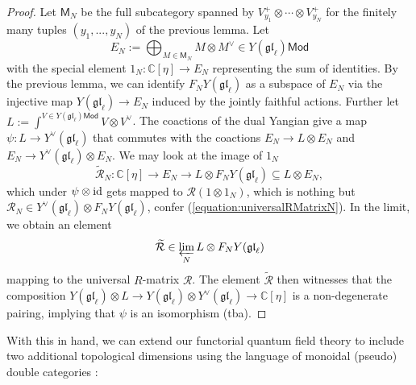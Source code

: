 \documentclass[11pt]{report}
\theoremstyle{definition}
\theoremstyle{remark}
\theoremstyle{remark}
\newcommand{\id}{\textnormal{id}}
\newcommand{\C}{\mathbb{C}}
\begin{document}
\begin{proof}
Let $\mathsf{M}_N$ be the full subcategory spanned by $V_{y_1}^+ \otimes \cdots \otimes V_{y_N}^+$ for the finitely many tuples $(y_1,...,y_N)$ of the previous lemma. Let
\begin{equation*}
E_N := \bigoplus_{M \in \mathsf{M}_N} M \otimes M^\vee \in Y(\mathfrak{gl}_\ell)\mathsf{Mod}
\end{equation*}
with the special element $1_N: \C[\eta] \to E_N$ representing the sum of identities. By the previous lemma, we can identify $F_N Y(\mathfrak{gl}_\ell)$ as a subspace of $E_N$ via the injective map $Y(\mathfrak{gl}_\ell) \to E_N$ induced by the jointly faithful actions. Further let $L := \int^{V \in Y(\mathfrak{gl}_\ell)\mathsf{Mod}} V \otimes V^\vee$. The coactions of the dual Yangian give a map $\psi: L \to Y^\vee(\mathfrak{gl}_\ell)$ that commutes with the coactions $E_N \to L \otimes E_N$ and $E_N \to Y^\vee(\mathfrak{gl}_\ell) \otimes E_N$. We may look at the image of $1_N$
\begin{equation*}
\widetilde{\mathcal{R}}_N: \C[\eta] \to E_N \to L \otimes F_N Y(\mathfrak{gl}_\ell) \subseteq L \otimes E_N,
\end{equation*}
which under $\psi \otimes \id$ gets mapped to $\mathcal{R}(1 \otimes 1_N)$, which is nothing but $\mathcal{R}_N \in Y^\vee(\mathfrak{gl}_\ell) \otimes F_N Y(\mathfrak{gl}_\ell)$, confer (\ref{equation:universalRMatrixN}). In the limit, we obtain an element
\begin{equation*}
\widetilde{\mathcal{R}} \in \varprojlim_N L \otimes F_N Y(\mathfrak{gl}_\ell)
\end{equation*}
mapping to the universal $R$-matrix $\mathcal{R}$. The element $\widetilde{\mathcal{R}}$ then witnesses that the composition $Y(\mathfrak{gl}_\ell) \otimes L \to Y(\mathfrak{gl}_\ell) \otimes Y^\vee(\mathfrak{gl}_\ell) \to \C[\eta]$ is a non-degenerate pairing, implying that $\psi$ is an isomorphism (tba).
\end{proof}

With this in hand, we can extend our functorial quantum field theory to include two additional topological dimensions using the language of monoidal (pseudo) double categories \cite{article:hansen:2019}:
\end{document}
